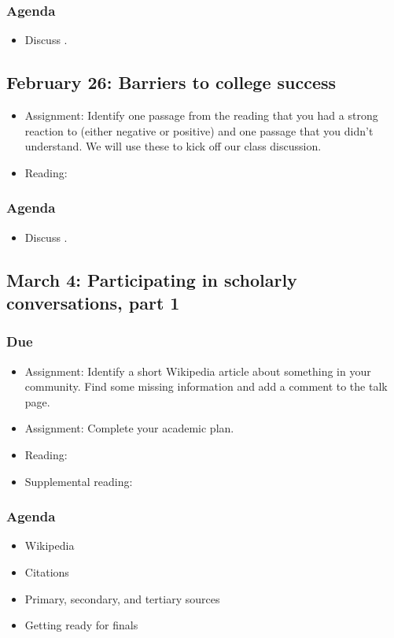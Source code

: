 \documentclass[12pt,article,oneside]{memoir}
\begin{document}
\subsubsection{Agenda}
\begin{itemize}
\item Discuss \cite{guillory2008s}.
\end{itemize}


\subsection{February 26: Barriers to college success}
\begin{itemize}
 \item Assignment: Identify one passage from the reading that you had a strong reaction to (either negative or positive) and one passage that you didn't understand.  We will use these to kick off our class discussion.
 \item Reading: \cite{guillory2008s}
\end{itemize}

\subsubsection{Agenda}
\begin{itemize}
\item Discuss \cite{guillory2008s}.
\end{itemize}



\subsection{March 4: Participating in scholarly conversations, part 1}
\subsubsection{Due}
\begin{itemize}
 \item Assignment: Identify a short Wikipedia article about something in your community.  Find some missing information and add a comment to the talk page.
 \item Assignment: Complete your academic plan.
 \item Reading: \cite{eval}
 \item Supplemental reading: \cite{training}
\end{itemize}

\subsubsection{Agenda}
\begin{itemize}
\item Wikipedia
\item Citations
\item Primary, secondary, and tertiary sources
\item Getting ready for finals
\end{itemize}
\end{document}
